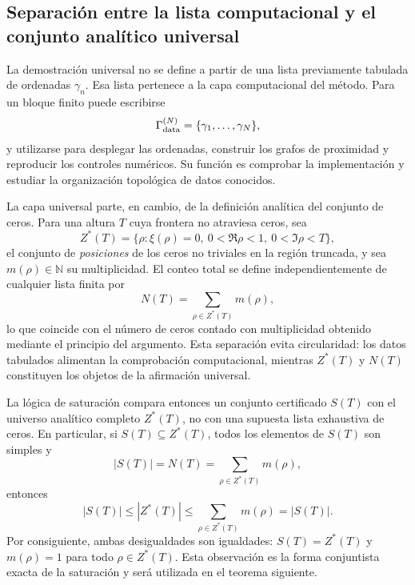 \documentclass[11pt]{amsart}
\theoremstyle{definition}
\theoremstyle{remark}
\begin{document}
\subsection{Separación entre la lista computacional y el conjunto analítico universal}\label{subsec:list-vs-set}
La demostración universal no se define a partir de una lista previamente tabulada de ordenadas $\gamma_n$. Esa lista pertenece a la capa computacional del método. Para un bloque finito puede escribirse
\begin{equation}\label{eq:computational-list}
 \Gamma_{\rm data}^{(N)}=\{\gamma_1,\ldots,\gamma_N\},
\end{equation}
y utilizarse para desplegar las ordenadas, construir los grafos de proximidad y reproducir los controles numéricos. Su función es comprobar la implementación y estudiar la organización topológica de datos conocidos.

La capa universal parte, en cambio, de la definición analítica del conjunto de ceros. Para una altura $T$ cuya frontera no atraviesa ceros, sea
\begin{equation}\label{eq:analytic-support}
 Z^*(T)=\{\rho:\xi(\rho)=0,\ 0<\Re\rho<1,\ 0<\Im\rho<T\},
\end{equation}
el conjunto de \emph{posiciones} de los ceros no triviales en la región truncada, y sea $m(\rho)\in\mathbb N$ su multiplicidad. El conteo total se define independientemente de cualquier lista finita por
\begin{equation}\label{eq:NTmultiplicity}
 N(T)=\sum_{\rho\in Z^*(T)}m(\rho),
\end{equation}
lo que coincide con el número de ceros contado con multiplicidad obtenido mediante el principio del argumento. Esta separación evita circularidad: los datos tabulados alimentan la comprobación computacional, mientras $Z^*(T)$ y $N(T)$ constituyen los objetos de la afirmación universal.

La lógica de saturación compara entonces un conjunto certificado $S(T)$ con el universo analítico completo $Z^*(T)$, no con una supuesta lista exhaustiva de ceros. En particular, si $S(T)\subseteq Z^*(T)$, todos los elementos de $S(T)$ son simples y
\begin{equation}\label{eq:saturation-simple-chain}
 |S(T)|=N(T)=\sum_{\rho\in Z^*(T)}m(\rho),
\end{equation}
entonces
\[
 |S(T)|\le |Z^*(T)|\le \sum_{\rho\in Z^*(T)}m(\rho)=|S(T)|.
\]
Por consiguiente, ambas desigualdades son igualdades: $S(T)=Z^*(T)$ y $m(\rho)=1$ para todo $\rho\in Z^*(T)$. Esta observación es la forma conjuntista exacta de la saturación y será utilizada en el teorema siguiente.
\end{document}
